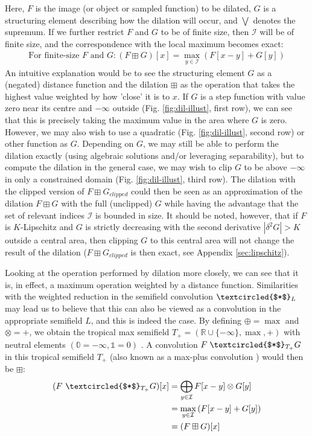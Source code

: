 \documentclass[a4paper, 12pt]{report}
\begin{document}
Here, $F$ is the image (or object or sampled function) to be dilated, $G$ is a structuring element describing how the dilation will occur, and $\bigvee$ denotes the supremum. If we further restrict $F$ and $G$ to be of finite size, then $\mathcal{I}$ will be of finite size, and the correspondence with the local maximum becomes exact:
\begin{align}
\textrm{For finite-size }F\textrm{ and }G: (F \boxplus G)[x] = \max_ {y\in\mathcal{I}} \left(F[x-y] + G[y]\right)	
\end{align}
 An intuitive explanation would be to see the structuring element $G$ as a (negated) distance function and the dilation $\boxplus$ as the operation that takes the highest value weighted by how 'close' it is to $x$. If $G$ is a step function with value zero near its centre and $-\infty$ outside (Fig. \ref{fig:dil-illust}, first row), we can see that this is precisely taking the maximum value in the area where $G$ is zero. However, we may also wish to use a quadratic (Fig. \ref{fig:dil-illust}, second row) or other function as $G$. Depending on $G$, we may still be able to perform the dilation exactly (using algebraic solutions and/or leveraging separability), but to compute the dilation in the general case, we may wish to clip $G$ to be above $-\infty$ in only a constrained domain (Fig. \ref{fig:dil-illust}, third row). The dilation with the clipped version of $F\boxplus G_{clipped}$ could then be seen as an approximation of the dilation $F\boxplus G$ with the full (unclipped) $G$ while having the advantage that the set of relevant indices $\mathcal{I}$ is bounded in size. It should be noted, however, that if $F$ is $K$-Lipschitz and $G$ is strictly decreasing with the second derivative $|\delta^2 G|>K$ outside a central area, then clipping $G$ to this central area will not change the result of the dilation ($F\boxplus G_{clipped}$ is then exact, see Appendix \ref{sec:lipschitz}).

Looking at the operation performed by dilation more closely, we can see that it is, in effect, a maximum operation weighted by a distance function. Similarities with the weighted reduction in the semifield convolution $\textcircled{$*$}_L$ may lead us to believe that this can also be viewed as a convolution in the appropriate semifield $L$, and this is indeed the case. By defining $\oplus=\max$ and $\otimes=+$, we obtain the tropical max semifield $T_+=(\mathbb{R}\cup\{-\infty\},\max,+)$ with neutral elements $(\mathbb{0}=-\infty, \mathbb{1}=0)$ \cite{maragos, bellaardaxiomatic}. A convolution $F \;\textcircled{$*$}_{T_+} G$ in this tropical semifield $T_+$ (also known as a max-plus convolution \cite{maragos}) would then be $\boxplus$:
\begin{align*}
	(F ~\textcircled{$*$}_{T_+} G)[x]
	&= \bigoplus_{y\in \mathcal{I}}F[x-y] \otimes G[y] \\
	&= \max_{y\in \mathcal{I}}\left(F[x-y] + G[y]\right) \\
	&= (F \boxplus G)[x]
\end{align*}
\end{document}
